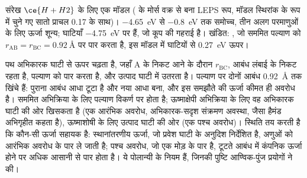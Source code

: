 \begin{omfigure}

{\small संरेख $\ce{H + H2}$ के लिए एक मॉडल  ( के मोर्स वक्र से बना LEPS रूप,
मॉडल स्थिरांक के रूप में चुने गए सातो प्राचल 0.17 के साथ)।
\qty{-4.65}{eV} से \qty{-0.8}{eV} तक समोच्च, तीन अलग परमाणुओं के लिए ऊर्जा शून्य;
घाटियाँ \qty{-4.75}{eV} पर हैं, जो  कूप की गहराई है। खंडित: , जो सममित पल्याण को $r_{\mathrm{AB}} = r_{\mathrm{BC}} = \qty{0.92}{\angstrom}$ पर पार करता है,
इस मॉडल में घाटियों से \qty{0.27}{eV} ऊपर।}
\end{omfigure}

पथ अभिकारक घाटी से ऊपर चढ़ता है, जहाँ A के निकट आने के दौरान $r_{\mathrm{BC}}$, 
आबंध लंबाई के निकट रहता है, पल्याण को पार करता है, और
उत्पाद घाटी में उतरता है। पल्याण पर दोनों आबंध \qty{0.92}{\angstrom} तक खिंचे हैं: पुराना
आबंध आधा टूटा है और नया आधा बना, और इस समझौते की ऊर्जा
कीमत ही अवरोध है। सममित अभिक्रिया के लिए पल्याण
विकर्ण पर होता है; ऊष्माक्षेपी अभिक्रिया के लिए वह अभिकारक घाटी की ओर खिसकता है (एक
आरंभिक अवरोध, अभिकारक-सदृश संक्रमण अवस्था, जैसा हैमंड अभिगृहीत
कहता है), ऊष्माशोषी के लिए उत्पाद घाटी की ओर (एक पश्च अवरोध)।
स्थिति तय करती है कि कौन-सी ऊर्जा सहायक है: स्थानांतरणीय ऊर्जा, जो
प्रवेश घाटी के अनुदिश निर्देशित है, अणुओं को आरंभिक अवरोध के पार ले जाती है; पश्च
अवरोध, जो एक मोड़ के पार है, टूटते आबंध में कंपनिक ऊर्जा होने पर अधिक आसानी से
पार होता है। ये पोलान्यी के नियम हैं, जिनकी पुष्टि आण्विक-पुंज
प्रयोगों ने की।


